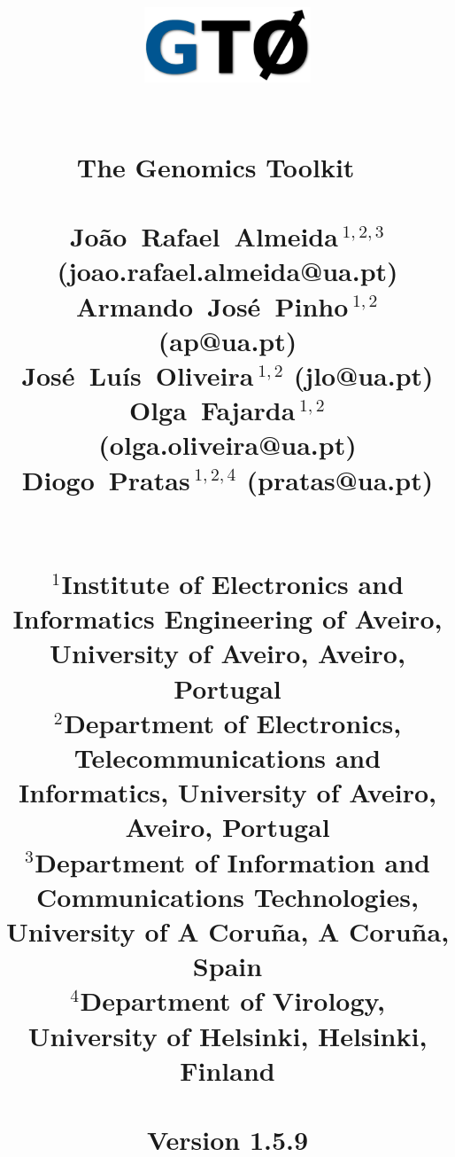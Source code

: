\documentclass[11pt,journal,compsoc]{report}[1]
\begin{document}
\title{
%
\begin{figure}[h!]
\centerline{\includegraphics[width=5cm]{../imgs/logo.pdf}}
\label{logo}
\end{figure}
~\\
\textbf{The Genomics Toolkit}
~\\~\\
\large
Jo\~ao~Rafael~Almeida\,$^{1,2,3}$ (joao.rafael.almeida@ua.pt)\\
Armando~Jos\'e~Pinho\,$^{1,2}$ (ap@ua.pt)\\
Jos\'e~Lu\'is~Oliveira\,$^{1,2}$ (jlo@ua.pt)\\
Olga~Fajarda\,$^{1,2}$ (olga.oliveira@ua.pt)\\
Diogo~Pratas\,$^{1,2,4}$ (pratas@ua.pt)\\
~\\~\\
\small
$^1$Institute of Electronics and Informatics Engineering of Aveiro, University of Aveiro, Aveiro, Portugal\\
$^2$Department of Electronics, Telecommunications and Informatics, University of Aveiro, Aveiro, Portugal\\
$^3$Department of Information and Communications Technologies, University of A Coru\~na, A Coru\~na, Spain\\
$^4$Department of Virology, University of Helsinki, Helsinki, Finland\\
~\\
Version 1.5.9
}
\date{}
\maketitle

\tableofcontents

\def \AminoAcidSequenceToolsPath {sections/Amino_acid_sequence_tools}
\def \FASTQToolsPath {sections/FASTQ_tools}
\def \FASTAToolsPath {sections/FASTA_tools}
\def \GenomicSequenceToolsPath {sections/Genomic_sequence_tools}
\def \GeneralPurposeToolsPath {sections/General_purpose_tools}












\end{document}
